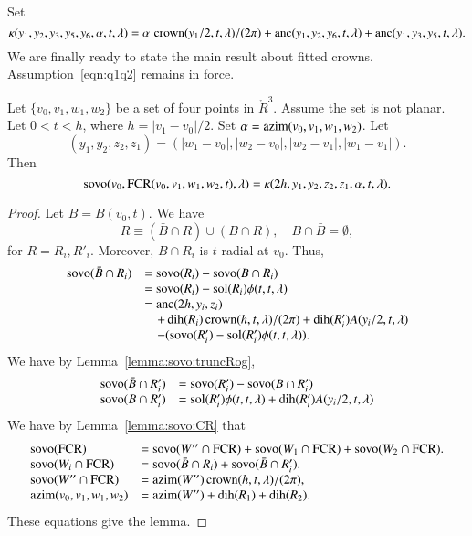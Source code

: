Set
    $$\kappa(y_1,y_2,y_3,y_5,y_6,\alpha,t,\lambda) =
   \alpha\,\operatorname{crown}(y_1/2,t,\lambda)/(2\pi) +
        \operatorname{anc}(y_1,y_2,y_6,t,\lambda)+\operatorname{anc}(y_1,y_3,y_5,t,\lambda).
    $$
We are finally ready to state the main result about fitted crowns.
Assumption~\ref{eqn:q1q2} remains in force.

\begin{lemma}\label{lemma:sovo:FCR}
Let $\{v_0,v_1,w_1,w_2\}$ be a set of four points in $\ring{R}^3$.
Assume the set is not planar.
Let $0 < t < h$, where $h = |v_1-v_0|/2$.
Set $\alpha = {\operatorname{azim}}(v_0,v_1,w_1,w_2)$.
Let 
 $$(y_1,y_2,z_2,z_1) =
   (|w_1-v_0|,|w_2-v_0|,|w_2-v_1|,|w_1-v_1|).
 $$
Then
$$
{\operatorname{sovo}}(v_0,{\operatorname{FCR}}(v_0,v_1,w_1,w_2,t),\lambda) =
 \kappa(2h,y_1,y_2,z_2,z_1,\alpha,t,\lambda).
$$
\end{lemma}

\begin{proof}
Let $B = B(v_0,t)$.  We have
$$R\equiv (\bar B\cap R) \cup (B\cap R),\quad B\cap \bar B = \emptyset,
$$
for $R=R_i,R'_i$.  Moreover, $B\cap R_i$ is $t$-radial at $v_0$.
Thus, 
 $$
\begin{array}{lll}
 {\operatorname{sovo}}(\bar B\cap R_i) &= {\operatorname{sovo}}(R_i) - {\operatorname{sovo}}(B\cap R_i)\\
 &= {\operatorname{sovo}}(R_i) - \operatorname{sol}(R_i)\phi(t,t,\lambda) \\
 &= {\operatorname{anc}}(2h,y_i,z_i) \\
    &\quad + \operatorname{dih}(R_i)\operatorname{crown}(h,t,\lambda)/(2\pi) + \operatorname{dih}(R'_i) A(y_i/2,t,\lambda)\\
  &\quad -({\operatorname{sovo}}(R_i') -\operatorname{sol}(R_i')\phi(t,t,\lambda)). \\
\end{array}
 $$
We have by Lemma~\ref{lemma:sovo:truncRog}, 
$$
\begin{array}{lll}
{\operatorname{sovo}}(\bar B\cap R_i') &= {\operatorname{sovo}}(R'_i) - {\operatorname{sovo}}(B\cap R'_i)\\
{\operatorname{sovo}}(B\cap R'_i) &= \operatorname{sol}(R'_i)\phi(t,t,\lambda) + \operatorname{dih}(R'_i) A(y_i/2,t,\lambda)\\
\end{array}
$$
We have by Lemma~\ref{lemma:sovo:CR} that
$$
\begin{array}{lll}
{\operatorname{sovo}}({\operatorname{FCR}}) &= {\operatorname{sovo}}(W''\cap {\operatorname{FCR}}) + {\operatorname{sovo}}(W_1\cap {\operatorname{FCR}})
 +{\operatorname{sovo}}(W_2\cap {\operatorname{FCR}}).\\
{\operatorname{sovo}}(W_i\cap {\operatorname{FCR}}) &= {\operatorname{sovo}}(\bar B\cap R_i) + {\operatorname{sovo}}(\bar B\cap R'_i).\\
 {\operatorname{sovo}}(W''\cap {\operatorname{FCR}}) &= {\operatorname{azim}}(W'')\operatorname{crown}(h,t,\lambda)/(2\pi),\\
{\operatorname{azim}}(v_0,v_1,w_1,w_2)&= {\operatorname{azim}}(W'')+\operatorname{dih}(R_1)+\operatorname{dih}(R_2).\\
\end{array}
$$
These equations give the lemma.
\end{proof}

